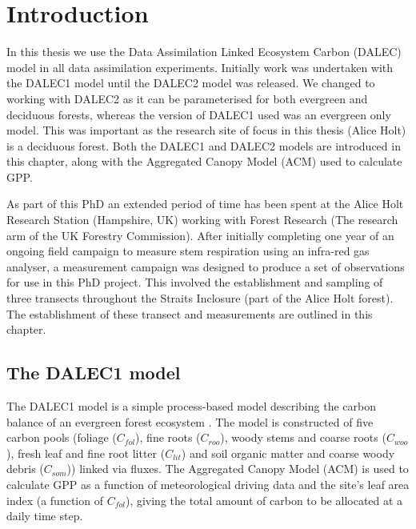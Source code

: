 
\section{Introduction}
In this thesis we use the Data Assimilation Linked Ecosystem Carbon (DALEC) model in all data assimilation experiments. Initially work was undertaken with the DALEC1 model until the DALEC2 model was released. We changed to working with DALEC2 as it can be parameterised for both evergreen and deciduous forests, whereas the version of DALEC1 used was an evergreen only model. This was important as the research site of focus in this thesis (Alice Holt) is a deciduous forest. Both the DALEC1 and DALEC2 models are introduced in this chapter, along with the Aggregated Canopy Model (ACM) used to calculate GPP. 

As part of this PhD an extended period of time has been spent at the Alice Holt Research Station (Hampshire, UK) working with Forest Research (The research arm of the UK Forestry Commission). After initially completing one year of an ongoing field campaign to measure stem respiration using an infra-red gas analyser, a measurement campaign was designed to produce a set of observations for use in this PhD project. This involved the establishment and sampling of three transects throughout the Straits Inclosure (part of the Alice Holt forest). The establishment of these transect and measurements are outlined in this chapter.

\subsection{The DALEC1 model} \label{chap5:sec:dalec1}

The DALEC1 model is a simple process-based model describing the carbon balance of an evergreen forest ecosystem \cite{williams2005improved}. The model is constructed of five carbon pools (foliage ($C_{fol}$), fine roots ($C_{roo}$), woody stems and coarse roots ($C_{woo}$), fresh leaf and fine root litter ($C_{lit}$) and soil organic matter and coarse woody debris ($C_{som}$)) linked via fluxes. The Aggregated Canopy Model (ACM) is used to calculate GPP as a function of meteorological driving data and the site's leaf area index (a function of $C_{fol}$), giving the total amount of carbon to be allocated at a daily time step.   

